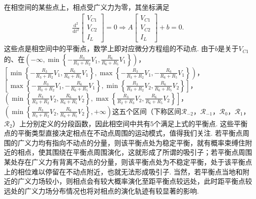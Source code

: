 \documentclass[a4paper, 10pt]{article}
\begin{document}
\begin{multicols*}{2}
在相空间的某些点上，相点受广义力为零，其坐标满足
\begin{align}
    \frac{\mathrm{d}^2}{\mathrm{d}t^2}\left[\begin{matrix}
        V_{C1}\\
        V_{C2}\\
        I_L
    \end{matrix}\right]=0\Longrightarrow A\left[\begin{matrix}
        V_{C1}\\
        V_{C2}\\
        I_L
    \end{matrix}\right]+b=0.
\end{align}
这些点是相空间中的平衡点，数学上即对应微分方程组的不动点. 由于$b$是关于$V_{C1}$的、在$\left(-\infty,\min\left\{-\frac{R_3}{R_3+R_2}V_1,\frac{R_6}{R_6+R_5}V_1\right\}\right)$，$\left[\min\left\{-\frac{R_3}{R_3+R_2}V_1,\frac{R_6}{R_6+R_5}V_1\right\},\max\left\{-\frac{R_3}{R_3+R_2}V_1,-\frac{R_6}{R_6+R_5}V_1\right\}\right)$，$\left[\max\left\{-\frac{R_3}{R_3+R_2}V_1,-\frac{R_6}{R_6+R_5}V_1\right\},\min\left\{\frac{R_3}{R_3+R_2}V_2,\frac{R_6}{R_6+R_5}V_2\right\}\right]$，$\left(\min\left\{\frac{R_3}{R_3+R_2}V_2,\frac{R_6}{R_6+R_5}V_2\right\},\max\left\{\frac{R_3}{R_2+R_3}V_2,\frac{R_6}{R_6+R_5}V_2\right\}\right]$，$\left(\min\left\{\frac{R_3}{R_3+R_2}V_2,\frac{R_6}{R_6+R_5}V_2\right\},+\infty\right)$这五个区间（下称区间$\mathcal{R}_{-2}$，$\mathcal{R}_{-1}$，$\mathcal{R}_0$，$\mathcal{R}_1$，$\mathcal{R}_2$）上分别定义的分段函数，因此相空间中共有$5$个满足上式的平衡点. 这些平衡点的平衡类型直接决定相点在不动点周围的运动模式，值得我们关注. 若平衡点周围的广义力均有指向不动点的分量，则该平衡点处为稳定平衡，就有概率束缚住附近的相点，使其围绕在平衡点周围演化，这就形成了所谓的吸引子；若平衡点周围某处存在广义力有背离不动点的分量，则该平衡点处为不稳定平衡，处于该平衡点上的相位难以停留在不动点附近，也就无法形成吸引子. 当然，若平衡点当地和附近的广义力场较小，则相点会有较大概率演化至距平衡点较远处，此时距平衡点较远处的广义力场分布情况也将对相点的演化轨迹有较显著的影响.


\end{multicols*}
\end{document}
